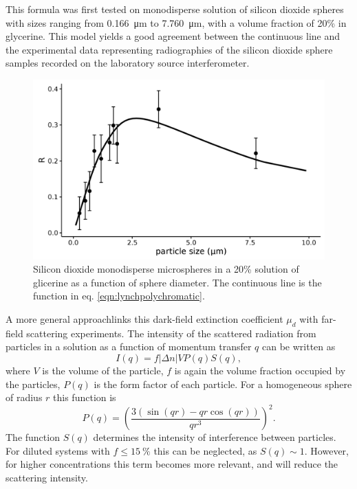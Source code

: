 This formula was first tested on monodisperse solution of silicon dioxide
spheres with sizes ranging from \SI{0.166}{\micro\meter} to
\SI{7.760}{\micro\meter}, with a volume fraction of 20\%
in glycerine. This model yields a good agreement between the continuous line
and the experimental data representing radiographies of the silicon dioxide
sphere samples recorded on the laboratory source interferometer.
\begin{figure}[h!]
\begin{center}
\includegraphics[width=0.70\columnwidth]{gfx/lung-paper-figures/summary/summary}
\caption{{Silicon dioxide monodisperse microspheres in a 20\% solution of
glicerine as a function of sphere diameter. The continuous line is the
function in eq. {\ref{eqn:lynchpolychromatic}}.
{\label{725462}}%
}}
\end{center}
\end{figure}

A more general approach\cn links this dark-field extinction coefficient
$\mu_d$ with far-field scattering experiments.
The intensity of the scattered radiation from particles in a solution as a function of momentum transfer $q$ can be written as\cn
\begin{equation}
    I(q) = f|\Delta n| V P(q) S(q),
    \label{eq:scattering.intensity}
\end{equation}
where $V$ is the volume of the particle, $f$ is again the volume fraction
occupied by the particles, $P(q)$ is the form factor of each particle. For a
homogeneous sphere of radius $r$ this function is\cn
\begin{equation}
    P(q) = \left(\frac{3(\sin(qr) - qr\cos(qr))}{qr^3}\right)^2.
    \label{eq:sphere.form.factor}
\end{equation}
The function $S(q)$ determines the intensity of interference between
particles. For diluted systems with $f \leq \SI{15}{\percent}$ this can
be neglected, as $S(q) \sim 1$. However, for higher concentrations this term
becomes more relevant, and will reduce the scattering intensity.

